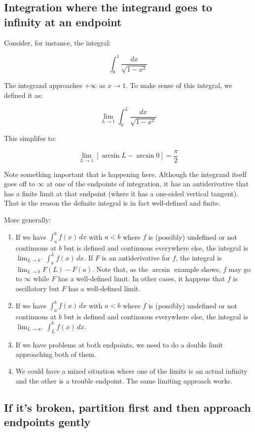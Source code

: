 \documentclass[10pt]{amsart}
\begin{document}
\subsection{Integration where the integrand goes to infinity at an endpoint}

Consider, for instance, the integral:

$$\int_0^1 \frac{dx}{\sqrt{1 - x^2}}$$

The integrand approaches $+\infty$ as $x \to 1$. To make sense of this
integral, we defined it as:

$$\lim_{L \to 1} \int_0^L \frac{dx}{\sqrt{1 - x^2}}$$

This simplifes to:

$$\lim_{L \to 1} [\arcsin L - \arcsin 0] = \frac{\pi}{2}$$

Note something important that is happening here. Although the
integrand itself goes off to $\infty$ at one of the endpoints of
integration, it has an antiderivative that has a finite limit at that
endpoint (where it has a one-sided vertical tangent). That is the
reason the definite integral is in fact well-defined and finite.

More generally:

\begin{enumerate}
\item If we have $\int_a^b f(x) \, dx$ with $a < b$ where $f$ is
  (possibly) undefined or not continuous at $b$ but is defined and
  continuous everywhere else, the integral is $\lim_{L \to b^-}
  \int_a^L f(x) \, dx$. If $F$ is an antiderivative for $f$, the
  integral is $\lim_{L \to b} F(L) - F(a)$. Note that, as the
  $\arcsin$ example shows, $f$ may go to $\infty$ while $F$ has a
  well-defined limit. In other cases, it happens that $f$ is
  oscillatory but $F$ has a well-defined limit.
\item If we have $\int_a^b f(x) \, dx$ with $a < b$ where $f$ is
  (possibly) undefined or not continuous at $b$ but is defined and
  continuous everywhere else, the integral is $\lim_{L \to a^+}
  \int_L^b f(x) \, dx$.
\item If we have problems at both endpoints, we need to do a double
  limit approaching both of them.
\item We could have a mixed situation where one of the limits is an
  actual infinity and the other is a trouble endpoint. The same
  limiting approach works.
\end{enumerate}

\subsection{If it's broken, partition first and then approach endpoints gently}
\end{document}
